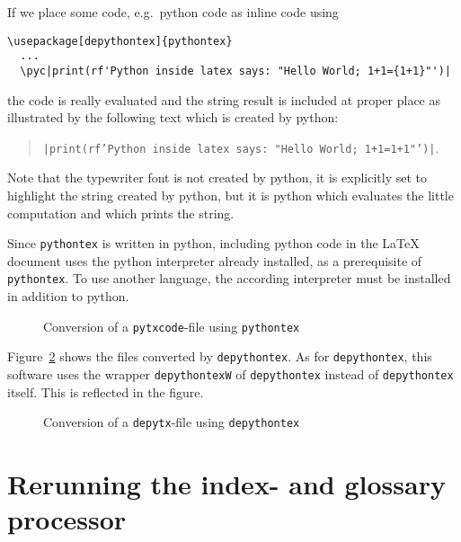 If we place some code, e.g.~python code as inline code using 
%
\begin{lstlisting}[basicstyle=\footnotesize]
  \usepackage[depythontex]{pythontex}
  ...
  \pyc|print(rf'Python inside latex says: "Hello World; 1+1={1+1}"')|
\end{lstlisting}
%
the code is really evaluated and the string result is included at proper place 
as illustrated by the following text which is created by python: 
%
\begin{quote}
  \texttt{\pyc|print(rf'Python inside latex says: "Hello World; 1+1={1+1}"')|}. %
\end{quote}
%
Note that the typewriter font is not created by python, 
it is explicitly set to highlight the string created by python, 
but it is python which evaluates the little computation 
and which prints the string. 

Since \texttt{pythontex} is written in python, 
including python code in the \LaTeX{} document 
uses the python interpreter already installed, as a prerequisite of \texttt{pythontex}. 
To use another language, the according interpreter must be installed in addition to python. 







\begin{figure}[!htb]
  \centering
  \caption{\label{fig:py2dir}Conversion of a \texttt{pytxcode}-file using \texttt{pythontex}}
  \end{figure}


  Figure~\ref{fig:depy2out} shows the files converted by \texttt{depythontex}. 
  As for \texttt{depythontex}, this software uses the wrapper \texttt{depythontexW} 
  of \texttt{depythontex} instead of \texttt{depythontex} itself. 
  This is reflected in the figure. 


  \begin{figure}[!htb]
    \centering
    \caption{\label{fig:depy2out}Conversion of a \texttt{depytx}-file using \texttt{depythontex}}
    \end{figure}
  
\section{Rerunning the index- and glossary processor}%
\label{sec:rerunMakeIndexGlossaries}

